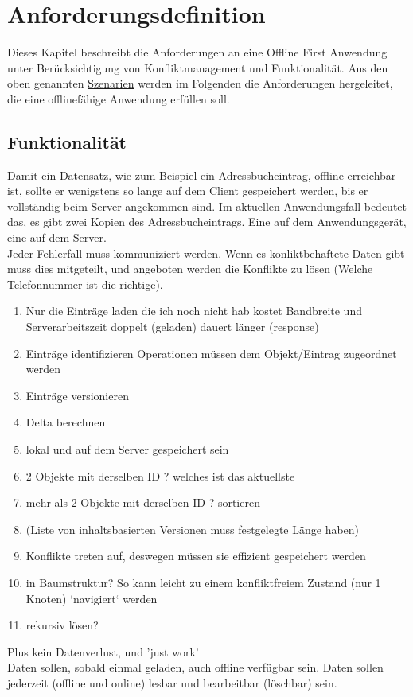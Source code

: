 \chapter{\label{chap:anforderungen}Anforderungsdefinition}
Dieses Kapitel beschreibt die Anforderungen an eine Offline First Anwendung unter Berücksichtigung von Konfliktmanagement und Funktionalität. 
Aus den oben genannten \hyperref[chap:szenarien]{Szenarien} werden im Folgenden die Anforderungen hergeleitet, die eine offlinefähige Anwendung erfüllen soll.
%
%

%
%
\section{Funktionalität}
Damit ein Datensatz, wie zum Beispiel ein Adressbucheintrag, offline erreichbar ist, sollte er wenigstens so lange auf dem Client gespeichert werden, bis er vollständig beim Server angekommen sind. Im aktuellen Anwendungsfall bedeutet das, es gibt zwei Kopien des Adressbucheintrags. Eine auf dem Anwendungsgerät, eine auf dem Server.\\
Jeder Fehlerfall muss kommuniziert werden. Wenn es konliktbehaftete Daten gibt muss dies mitgeteilt, und angeboten werden die Konflikte zu lösen (Welche Telefonnummer ist die richtige).\\
\begin{enumerate}
  \item Nur die Einträge laden die ich noch nicht hab
    \subitem kostet Bandbreite und Serverarbeitszeit
    \subitem doppelt (geladen)
    \subitem dauert länger (response)
  \item Einträge identifizieren
    \subitem Operationen müssen dem Objekt/Eintrag zugeordnet werden
  \item Einträge versionieren
  \item Delta berechnen
  \item lokal und auf dem Server gespeichert sein
  \item 2 Objekte mit derselben ID ? welches ist das aktuellste
  \item mehr als 2 Objekte mit derselben ID ? sortieren
  \item (Liste von inhaltsbasierten Versionen muss festgelegte Länge haben)
  \item Konflikte treten auf, deswegen müssen sie effizient gespeichert werden
  \item in Baumstruktur? So kann leicht zu einem konfliktfreiem Zustand (nur 1 Knoten) `navigiert` werden
  \item rekursiv lösen?
\end{enumerate}
 Plus kein Datenverlust, und 'just work'\\
Daten sollen, sobald einmal geladen, auch offline verfügbar sein.
Daten sollen jederzeit (offline und online) lesbar und bearbeitbar (löschbar) sein.
%
%
